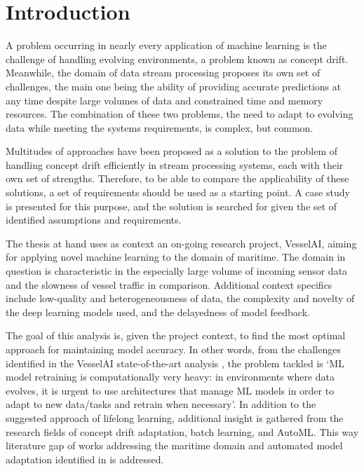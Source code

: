 \chapter{Introduction}
A problem occurring in nearly every application of machine learning is the challenge of handling evolving environments, a problem known as concept drift. Meanwhile, the domain of data stream processing proposes its own set of challenges, the main one being the ability of providing accurate predictions at any time despite large volumes of data and constrained time and memory resources. The combination of these two problems, the need to adapt to evolving data while meeting the systems requirements, is complex, but common.

Multitudes of approaches have been proposed as a solution to the problem of handling concept drift efficiently in stream processing systems, each with their own set of strengths. Therefore, to be able to compare the applicability of these solutions, a set of requirements should be used as a starting point. A case study is presented for this purpose, and the solution is searched for given the set of identified assumptions and requirements. 

The thesis at hand uses as context an on-going research project, VesselAI, aiming for applying novel machine learning to the domain of maritime. The domain in question is characteristic in the especially large volume of incoming sensor data and the slowness of vessel traffic in comparison. Additional context specifics include low-quality and heterogeneousness of data, the complexity and novelty of the deep learning models used, and the delayedness of model feedback. 

The goal of this analysis is, given the project context, to find the most optimal approach for maintaining model accuracy. In other words, from the challenges identified in the VesselAI state-of-the-art analysis \cite{D1.1}, the problem tackled is `ML model retraining is computationally very heavy: in environments where data evolves, it is urgent to use architectures that manage ML models in order to adapt to new data/tasks and retrain when necessary'. In addition to the suggested approach of lifelong learning, additional insight is gathered from the research fields of concept drift adaptation, batch learning, and AutoML.  This way literature gap of works addressing the maritime domain and automated model adaptation identified in \cite{D1.1} is addressed.   

